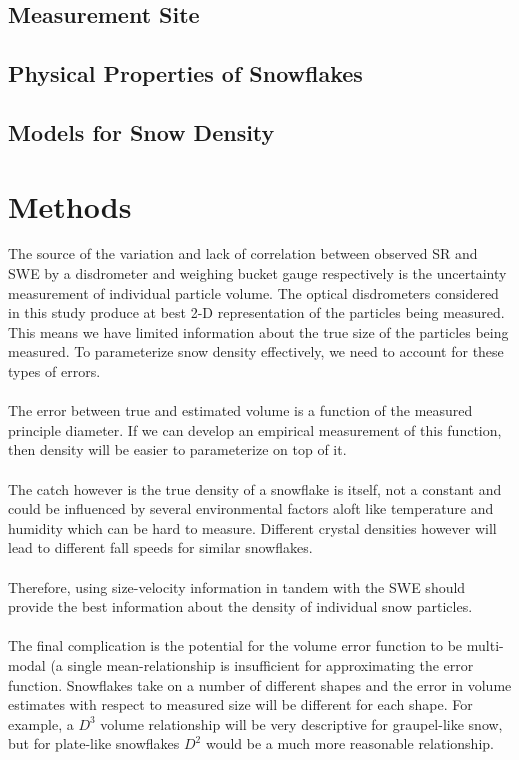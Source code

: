 \documentclass[10pt,a4paper]{article}
\begin{document}
\subsection{Measurement Site}
\subsection{Physical Properties of Snowflakes}
\subsection{Models for Snow Density}

\section{Methods}
The source of the variation and lack of correlation between observed SR and SWE by a disdrometer and weighing bucket gauge respectively is the uncertainty measurement of individual particle volume. The optical disdrometers considered in this study produce at best 2-D representation of the particles being measured. This means we have limited information about the true size of the particles being measured. To parameterize snow density effectively, we need to account for these types of errors.
\\\\
The error between true and estimated volume is a function of the measured principle diameter. If we can develop an empirical measurement of this function, then density will be easier to parameterize on top of it. 
\\\\
The catch however is the true density of a snowflake is itself, not a constant and could be influenced by several environmental factors aloft like temperature and humidity which can be hard to measure. Different crystal densities however will lead to different fall speeds for similar snowflakes.
\\\\
Therefore, using size-velocity information in tandem with the SWE should provide the best information about the density of individual snow particles. 
\\\\
The final complication is the potential for the volume error function to be multi-modal (a single mean-relationship is insufficient for approximating the error function. Snowflakes take on a number of different shapes and the error in volume estimates with respect to measured size will be different for each shape. For example, a $D^3$ volume relationship will be very descriptive for graupel-like snow, but for plate-like snowflakes $D^2$ would be a much more reasonable relationship. 
\end{document}
